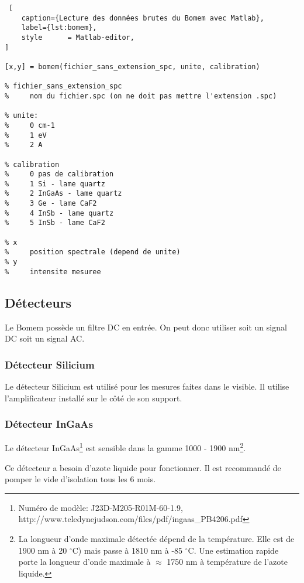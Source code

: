 \documentclass[11pt,francais]{book} %
\begin{document}
\begin{lstlisting} [
    caption={Lecture des données brutes du Bomem avec Matlab},
    label={lst:bomem},
    style      = Matlab-editor,
]

[x,y] = bomem(fichier_sans_extension_spc, unite, calibration)

% fichier_sans_extension_spc
%     nom du fichier.spc (on ne doit pas mettre l'extension .spc)

% unite: 
%     0	cm-1
%     1	eV
%     2	A

% calibration
%     0	pas de calibration
%     1	Si - lame quartz
%     2	InGaAs - lame quartz
%     3	Ge - lame CaF2
%     4	InSb - lame quartz
%     5	InSb - lame CaF2

% x
%     position spectrale (depend de unite)
% y
%     intensite mesuree

\end{lstlisting}

\subsection{Détecteurs}

Le Bomem possède un filtre DC en entrée.
On peut donc utiliser soit un signal DC soit un signal AC.

\subsubsection{Détecteur Silicium}

Le détecteur Silicium est utilisé pour les mesures faites dans le visible.
Il utilise l'amplificateur installé sur le côté de son support.

\subsubsection{Détecteur InGaAs}

Le détecteur InGaAs\footnote{Numéro de modèle: J23D-M205-R01M-60-1.9, http://www.teledynejudson.com/files/pdf/ingaas\_PB4206.pdf} est sensible dans la gamme 1000 - 1900 nm\footnote{La longueur d'onde maximale détectée dépend de la température. Elle est de 1900 nm à 20 $^{\circ}$C) mais passe à 1810 nm à -85 $^{\circ}$C. Une estimation rapide porte la longueur d'onde maximale à $\approx$ 1750 nm à température de l'azote liquide.}.

Ce détecteur a besoin d'azote liquide pour fonctionner.
Il est recommandé de pomper le vide d'isolation tous les 6 mois.
\end{document}
